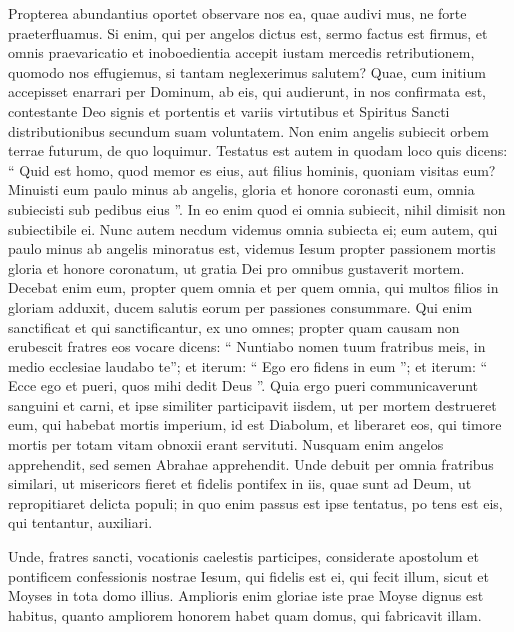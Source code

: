 \begin{biblechapter}
\begin{biblechapter}
\verse Propterea abundantius oportet observare nos ea, quae audivi mus, ne forte praeterfluamus. 
\verse Si enim, qui per angelos dictus est, sermo factus est firmus, et omnis praevaricatio et inoboedientia accepit iustam mercedis retributionem, 
\verse quomodo nos effugiemus, si tantam neglexerimus salutem? Quae, cum initium accepisset enarrari per Dominum, ab eis, qui audierunt, in nos confirmata est, 
\verse contestante Deo signis et portentis et variis virtutibus et Spiritus Sancti distributionibus secundum suam voluntatem.
 \verse Non enim angelis subiecit orbem terrae futurum, de quo loquimur. 
\verse Testatus est autem in quodam loco quis dicens:
 “ Quid est homo, quod memor es eius,
 aut filius hominis, quoniam visitas eum?
 \verse Minuisti eum paulo minus ab angelis,
 gloria et honore coronasti eum,
 \verse omnia subiecisti sub pedibus eius ”.
 In eo enim quod ei omnia subiecit, nihil dimisit non subiectibile ei. Nunc autem necdum videmus omnia subiecta ei; 
\verse eum autem, qui paulo minus ab angelis minoratus est, videmus Iesum propter passionem mortis gloria et honore coronatum, ut gratia Dei pro omnibus gustaverit mortem.
 \verse Decebat enim eum, propter quem omnia et per quem omnia, qui multos filios in gloriam adduxit, ducem salutis eorum per passiones consummare. 
\verse Qui enim sanctificat et qui sanctificantur, ex uno omnes; propter quam causam non erubescit fratres eos vocare 
\verse dicens:
 “ Nuntiabo nomen tuum fratribus meis,
 in medio ecclesiae laudabo te”;
 \verse et iterum: “ Ego ero fidens in eum ”;
 et iterum: “ Ecce ego et pueri, quos mihi dedit Deus ”.
 \verse Quia ergo pueri communicaverunt sanguini et carni, et ipse similiter participavit iisdem, ut per mortem destrueret eum, qui habebat mortis imperium, id est Diabolum, 
\verse et liberaret eos, qui timore mortis per totam vitam obnoxii erant servituti. 
\verse Nusquam enim angelos apprehendit, sed semen Abrahae apprehendit. 
\verse Unde debuit per omnia fratribus similari, ut misericors fieret et fidelis pontifex in iis,
 quae sunt ad Deum, ut repropitiaret delicta populi; 
\verse in quo enim passus est ipse tentatus, po tens est eis, qui tentantur, auxiliari.  
\begin{biblechapter}
\verse Unde, fratres sancti, vocationis caelestis participes, considerate apostolum et pontificem confessionis nostrae Iesum, 
\verse qui fidelis est ei, qui fecit illum, sicut et Moyses in tota domo illius. 
\verse Amplioris enim gloriae iste prae Moyse dignus est habitus, quanto ampliorem honorem habet quam domus, qui fabricavit illam. 

\end{biblechapter}
\end{biblechapter}
\end{biblechapter}
